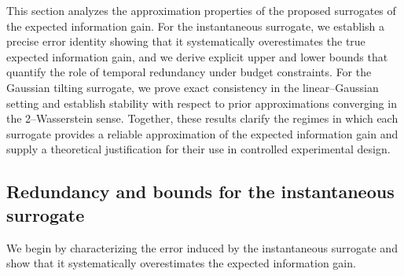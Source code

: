 \documentclass[a4paper,11pt]{article}
\begin{document}
This section analyzes the approximation properties of the proposed surrogates of the expected information gain.
For the instantaneous surrogate, we establish a precise error identity showing that it systematically overestimates the true expected information gain, and we derive explicit upper and lower bounds that quantify the role of temporal redundancy under budget constraints.
For the Gaussian tilting surrogate, we prove exact consistency in the linear–Gaussian setting and establish stability with respect to prior approximations converging in the 2–Wasserstein sense.
Together, these results clarify the regimes in which each surrogate provides a reliable approximation of the expected information gain and supply a theoretical justification for their use in controlled experimental design.

\subsection{Redundancy and bounds for the instantaneous surrogate} \label{subsection:theory_instant}

We begin by characterizing the error induced by the instantaneous surrogate
and show that it systematically overestimates the expected information gain.
\end{document}
